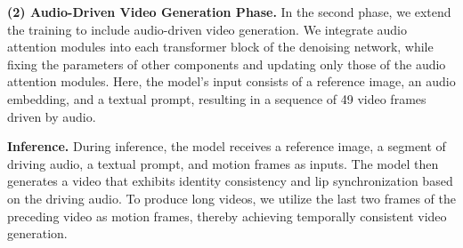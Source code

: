 \textbf{(2) Audio-Driven Video Generation Phase.} In the second phase, we extend the training to include audio-driven video generation. We integrate audio attention modules into each transformer block of the denoising network, while fixing the parameters of other components and updating only those of the audio attention modules. Here, the model's input consists of a reference image, an audio embedding, and a textual prompt, resulting in a sequence of 49 video frames driven by audio.

\noindent\textbf{Inference.}  
During inference, the model receives a reference image, a segment of driving audio, a textual prompt, and motion frames as inputs. 
The model then generates a video that exhibits identity consistency and lip synchronization based on the driving audio. 
To produce long videos, we utilize the last two frames of the preceding video as motion frames, thereby achieving temporally consistent video generation.


